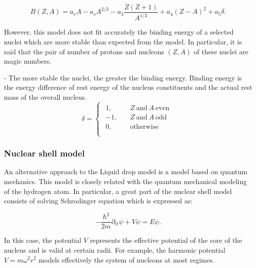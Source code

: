 \documentclass[openany]{book}
\begin{document}
\begin{equation} \label{eq:liquidDrop_bindingEnergy}
	B(Z,A )= a_vA - a_sA^{2/3} - a_3 \frac{Z(Z+1)}{A^{1/3}} +  a_4(Z-A)^2 +   a_5 \delta.
\end{equation}


However, this model does not fit accurately the binding energy of a selected nuclei which are more stable than expected from the model. In particular, it is said that the pair of number of protons and nucleons $(Z, A)$ of these nuclei are magic numbers. 


-	The more stable the nuclei, the greater the binding energy.
Binding energy is the energy difference of rest energy of the nucleus constituents and the actual  rest mass of the overall nucleus. \\


\begin{equation} \label{eq:liquidDrop_deltaFactor}
	\delta = 	\left\{\begin{array}{l}
		\begin{split}
			1, \quad & Z \ \mathrm{and} \ A \  \mathrm{even} \\ 
			-1, \quad &  Z \ \mathrm{and} \ A \  \mathrm{odd} 	\\
			0, \quad & \mathrm{otherwise}	\\
		\end{split}
	\end{array}\right.
\end{equation}
\subsubsection{Nuclear shell model}  \label{ssub:nuclearShellModel}

An alternative approach to the Liquid drop model is a model based on quantum mechanics. This model is closely related with the quantum mechanical modeling of the hydrogen atom. In particular, a great part of the nuclear shell model consists of solving Schrodinger equation which is expressed as:

\begin{equation} \label{eq:nuclearShell_schrodinger}
	- \frac{\hbar^2}{2m} \partial_{tt} \psi + V  \psi = E \psi.
\end{equation}

In this case, the potential $V$ represents the effective potential of the core of the nucleus and is valid at certain radii. For example, the harmonic potential $V = m\omega^2r^2$ models effectively the system of nucleons at most regimes. \\
\end{document}
